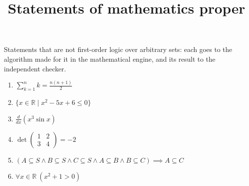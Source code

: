 \documentclass{article}
\title{Statements of mathematics proper}
\begin{document}
\maketitle
Statements that are not first-order logic over arbitrary sets: each goes to
the algorithm made for it in the mathematical engine, and its result to the
independent checker.
\begin{enumerate}
\item $\displaystyle \sum_{k=1}^{n} k = \frac{n(n+1)}{2}$
\item $\displaystyle \{x \in \mathbb{R} \mid x^{2} - 5x + 6 \le 0\}$
\item $\displaystyle \frac{d}{dx}\left( x^{3} \sin x \right)$
\item $\displaystyle \det \begin{pmatrix} 1 & 2 \\ 3 & 4 \end{pmatrix} = -2$
\item $\displaystyle (A \subseteq S \land B \subseteq S \land C \subseteq S \land A \subseteq B \land B \subseteq C) \implies A \subseteq C$
\item $\displaystyle \forall x \in \mathbb{R}\ \left(x^{2} + 1 > 0\right)$
\end{enumerate}
\end{document}
